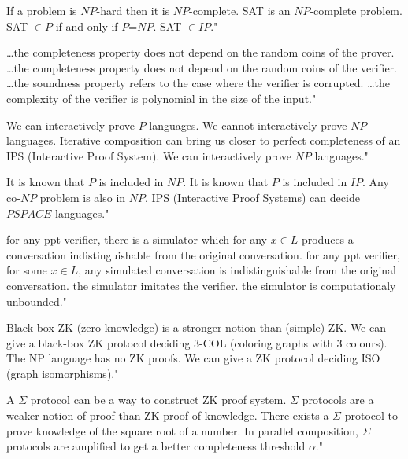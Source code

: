 {If a problem is $NP$-hard then it is $NP$-complete.}
{SAT is an $NP$-complete problem.}
{SAT $\in P$ if and only if $P$=$NP$.}
{SAT $\in IP$."}

{\ldots the completeness property does not depend on the random coins of the prover.}
{\ldots the completeness property does not depend on the random coins of the verifier.}
{\ldots the soundness property refers to the case where the verifier is corrupted.}
{\ldots the complexity of the verifier is polynomial in the size of the input."}

{We can interactively prove $P$ languages.}
{We cannot interactively prove $NP$ languages.}
{Iterative composition can bring us closer to perfect completeness of an IPS (Interactive Proof System).}
{We can interactively prove $NP$ languages."}

{It is known that $P$ is included in $NP$.}
{It is known that $P$ is included in $IP$.}
{Any co-$NP$ problem is also in $NP$.}
{IPS (Interactive Proof Systems) can decide $PSPACE$ languages."}

{for any ppt verifier, there is a simulator which for any $x \in L$ produces a conversation indistinguishable from the original conversation.}
{for any ppt verifier, for some $x \in L$, any simulated conversation is indistinguishable from the original conversation.}
{the simulator imitates the verifier.}
{the simulator is computationaly unbounded."}

{Black-box ZK (zero knowledge) is a stronger notion than (simple) ZK.}
{We can give a black-box ZK protocol deciding 3-COL (coloring graphs with 3 colours).}
{The NP language has no ZK proofs.}
{We can give a ZK protocol deciding ISO (graph isomorphisms)."}

{A $\Sigma$ protocol can be a way to construct ZK proof system.}
{$\Sigma$ protocols are a weaker notion of proof than ZK proof of knowledge.}
{There exists a $\Sigma$ protocol to prove knowledge of the square root of a number.}
{In parallel composition, $\Sigma$ protocols are amplified to get a better completeness threshold $\alpha$."}

